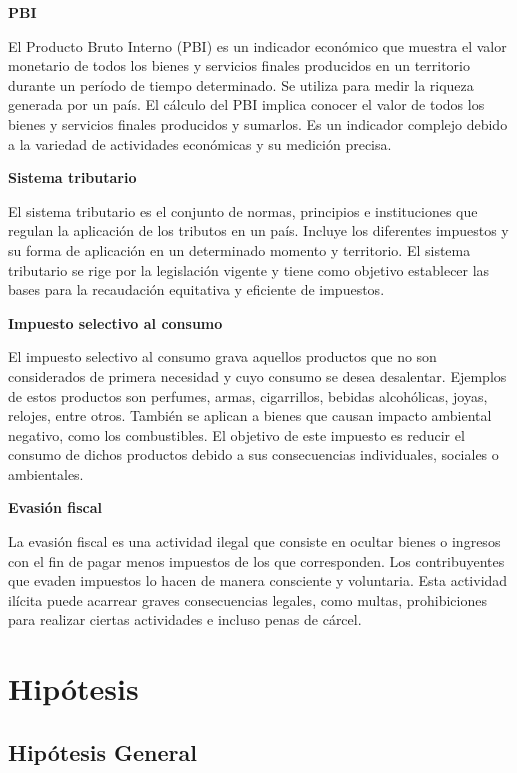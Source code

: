 \documentclass[
  letterpaper,
  DIV=11,
  numbers=noendperiod]{scrartcl}
\begin{document}
\textbf{PBI}

El Producto Bruto Interno (PBI) es un indicador económico que muestra el
valor monetario de todos los bienes y servicios finales producidos en un
territorio durante un período de tiempo determinado. Se utiliza para
medir la riqueza generada por un país. El cálculo del PBI implica
conocer el valor de todos los bienes y servicios finales producidos y
sumarlos. Es un indicador complejo debido a la variedad de actividades
económicas y su medición precisa.

\textbf{Sistema tributario}

El sistema tributario es el conjunto de normas, principios e
instituciones que regulan la aplicación de los tributos en un país.
Incluye los diferentes impuestos y su forma de aplicación en un
determinado momento y territorio. El sistema tributario se rige por la
legislación vigente y tiene como objetivo establecer las bases para la
recaudación equitativa y eficiente de impuestos.

\textbf{Impuesto selectivo al consumo}

El impuesto selectivo al consumo grava aquellos productos que no son
considerados de primera necesidad y cuyo consumo se desea desalentar.
Ejemplos de estos productos son perfumes, armas, cigarrillos, bebidas
alcohólicas, joyas, relojes, entre otros. También se aplican a bienes
que causan impacto ambiental negativo, como los combustibles. El
objetivo de este impuesto es reducir el consumo de dichos productos
debido a sus consecuencias individuales, sociales o ambientales.

\textbf{Evasión fiscal}

La evasión fiscal es una actividad ilegal que consiste en ocultar bienes
o ingresos con el fin de pagar menos impuestos de los que corresponden.
Los contribuyentes que evaden impuestos lo hacen de manera consciente y
voluntaria. Esta actividad ilícita puede acarrear graves consecuencias
legales, como multas, prohibiciones para realizar ciertas actividades e
incluso penas de cárcel.

\hypertarget{sec-hipuxf3tesis}{%
\section{Hipótesis}\label{sec-hipuxf3tesis}}

\hypertarget{sec-hipuxf3tesis-general}{%
\subsection{Hipótesis General}\label{sec-hipuxf3tesis-general}}
\end{document}

